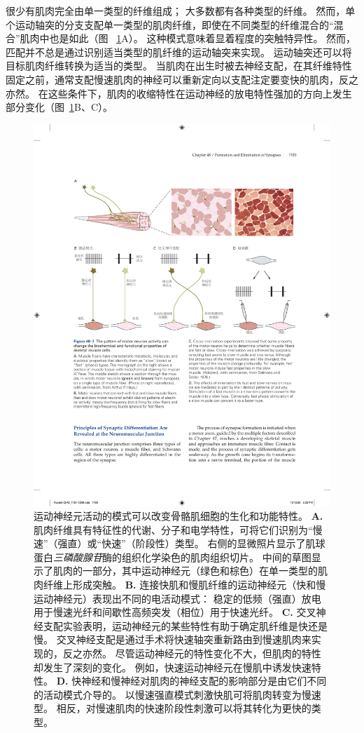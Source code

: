 很少有肌肉完全由单一类型的纤维组成； 大多数都有各种类型的纤维。
然而，单个运动轴突的分支支配单一类型的肌肉纤维，即使在不同类型的纤维混合的“混合”肌肉中也是如此（图 ~\ref{fig:48_7}A）。
这种模式意味着显着程度的突触特异性。
然而，匹配并不总是通过识别适当类型的肌纤维的运动轴突来实现。
运动轴突还可以将目标肌肉纤维转换为适当的类型。
当肌肉在出生时被去神经支配，在其纤维特性固定之前，通常支配慢速肌肉的神经可以重新定向以支配注定要变快的肌肉，反之亦然。
在这些条件下，肌肉的收缩特性在运动神经的放电特性强加的方向上发生部分变化（图~\ref{fig:48_7}B、C）。


\begin{figure}[htbp]
	\centering
	\includegraphics[width=1.0\linewidth]{chap48/fig_48_7}
	\caption{运动神经元活动的模式可以改变骨骼肌细胞的生化和功能特性。
		\textbf{A.} 肌肉纤维具有特征性的代谢、分子和电学特性，可将它们识别为“慢速”（强直）或“快速”（阶段性）类型。
		右侧的显微照片显示了肌球蛋白\textit{三磷酸腺苷}酶的组织化学染色的肌肉组织切片。
		中间的草图显示了肌肉的一部分，其中运动神经元（绿色和棕色）在单一类型的肌肉纤维上形成突触。
		\textbf{B.} 连接快肌和慢肌纤维的运动神经元（快和慢运动神经元）表现出不同的电活动模式：
		稳定的低频（强直）放电 用于慢速光纤和间歇性高频突发（相位）用于快速光纤。
		\textbf{C.} 交叉神经支配实验表明，运动神经元的某些特性有助于确定肌纤维是快还是慢。
		交叉神经支配是通过手术将快速轴突重新路由到慢速肌肉来实现的，反之亦然。
		尽管运动神经元的特性变化不大，但肌肉的特性却发生了深刻的变化。
		例如，快速运动神经元在慢肌中诱发快速特性\cite{salmons1976significance}。
		\textbf{D.} 快神经和慢神经对肌肉的神经支配的影响部分是由它们不同的活动模式介导的。
		以慢速强直模式刺激快肌可将肌肉转变为慢速型。
		相反，对慢速肌肉的快速阶段性刺激可以将其转化为更快的类型。}
	\label{fig:48_7}
\end{figure}


